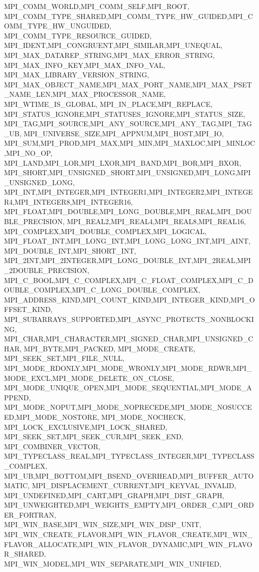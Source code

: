 {{{{{    %
    MPI_COMM_WORLD,MPI_COMM_SELF,MPI_ROOT,
    MPI_COMM_TYPE_SHARED,MPI_COMM_TYPE_HW_GUIDED,MPI_COMM_TYPE_HW_UNGUIDED,
    MPI_COMM_TYPE_RESOURCE_GUIDED,
    MPI_IDENT,MPI_CONGRUENT,MPI_SIMILAR,MPI_UNEQUAL,
    MPI_MAX_DATAREP_STRING,MPI_MAX_ERROR_STRING,
    MPI_MAX_INFO_KEY,MPI_MAX_INFO_VAL, MPI_MAX_LIBRARY_VERSION_STRING,
    MPI_MAX_OBJECT_NAME,MPI_MAX_PORT_NAME,MPI_MAX_PSET_NAME_LEN,MPI_MAX_PROCESSOR_NAME,    
    MPI_WTIME_IS_GLOBAL, MPI_IN_PLACE,MPI_REPLACE,
    MPI_STATUS_IGNORE,MPI_STATUSES_IGNORE,MPI_STATUS_SIZE,
    MPI_TAG,MPI_SOURCE,MPI_ANY_SOURCE,MPI_ANY_TAG,MPI_TAG_UB,
    MPI_UNIVERSE_SIZE,MPI_APPNUM,MPI_HOST,MPI_IO,
    MPI_SUM,MPI_PROD,MPI_MAX,MPI_MIN,MPI_MAXLOC,MPI_MINLOC,MPI_NO_OP,
    MPI_LAND,MPI_LOR,MPI_LXOR,MPI_BAND,MPI_BOR,MPI_BXOR,
    MPI_SHORT,MPI_UNSIGNED_SHORT,MPI_UNSIGNED,MPI_LONG,MPI_UNSIGNED_LONG,
    MPI_INT,MPI_INTEGER,MPI_INTEGER1,MPI_INTEGER2,MPI_INTEGER4,MPI_INTEGER8,MPI_INTEGER16,
    MPI_FLOAT,MPI_DOUBLE,MPI_LONG_DOUBLE,MPI_REAL,MPI_DOUBLE_PRECISION,
    MPI_REAL2,MPI_REAL4,MPI_REAL8,MPI_REAL16,
    MPI_COMPLEX,MPI_DOUBLE_COMPLEX,MPI_LOGICAL,
    MPI_FLOAT_INT,MPI_LONG_INT,MPI_LONG_LONG_INT,MPI_AINT,MPI_DOUBLE_INT,MPI_SHORT_INT,
    MPI_2INT,MPI_2INTEGER,MPI_LONG_DOUBLE_INT,MPI_2REAL,MPI_2DOUBLE_PRECISION,
    MPI_C_BOOL,MPI_C_COMPLEX,MPI_C_FLOAT_COMPLEX,MPI_C_DOUBLE_COMPLEX,MPI_C_LONG_DOUBLE_COMPLEX,
    MPI_ADDRESS_KIND,MPI_COUNT_KIND,MPI_INTEGER_KIND,MPI_OFFSET_KIND,
    MPI_SUBARRAYS_SUPPORTED,MPI_ASYNC_PROTECTS_NONBLOCKING,
    MPI_CHAR,MPI_CHARACTER,MPI_SIGNED_CHAR,MPI_UNSIGNED_CHAR,
    MPI_BYTE,MPI_PACKED, MPI_MODE_CREATE,
    MPI_SEEK_SET,MPI_FILE_NULL,
    MPI_MODE_RDONLY,MPI_MODE_WRONLY,MPI_MODE_RDWR,MPI_MODE_EXCL,MPI_MODE_DELETE_ON_CLOSE,
    MPI_MODE_UNIQUE_OPEN,MPI_MODE_SEQUENTIAL,MPI_MODE_APPEND,
    MPI_MODE_NOPUT,MPI_MODE_NOPRECEDE,MPI_MODE_NOSUCCEED,MPI_MODE_NOSTORE,
    MPI_MODE_NOCHECK, MPI_LOCK_EXCLUSIVE,MPI_LOCK_SHARED,
    MPI_SEEK_SET,MPI_SEEK_CUR,MPI_SEEK_END,
    MPI_COMBINER_VECTOR,
    MPI_TYPECLASS_REAL,MPI_TYPECLASS_INTEGER,MPI_TYPECLASS_COMPLEX,
    MPI_UB,MPI_BOTTOM,MPI_BSEND_OVERHEAD,MPI_BUFFER_AUTOMATIC,
    MPI_DISPLACEMENT_CURRENT,MPI_KEYVAL_INVALID,
    MPI_UNDEFINED,MPI_CART,MPI_GRAPH,MPI_DIST_GRAPH,
    MPI_UNWEIGHTED,MPI_WEIGHTS_EMPTY,MPI_ORDER_C,MPI_ORDER_FORTRAN,
    MPI_WIN_BASE,MPI_WIN_SIZE,MPI_WIN_DISP_UNIT,
    MPI_WIN_CREATE_FLAVOR,MPI_WIN_FLAVOR_CREATE,MPI_WIN_FLAVOR_ALLOCATE,MPI_WIN_FLAVOR_DYNAMIC,MPI_WIN_FLAVOR_SHARED,
    MPI_WIN_MODEL,MPI_WIN_SEPARATE,MPI_WIN_UNIFIED,
}}}}}
